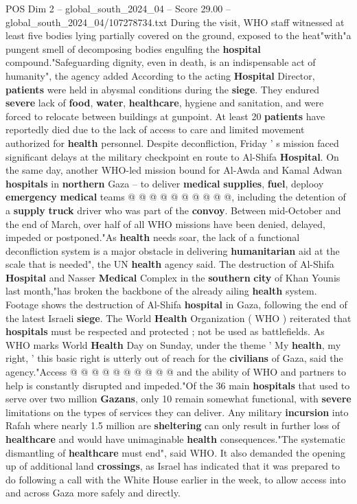 \begin{textsample}{POS Dim 2 – global\_south\_2024\_04 – Score 29.00 – global\_south\_2024\_04/107278734.txt}
During the visit, WHO staff witnessed at least five bodies lying partially covered on the ground, exposed to the heat"with"a pungent smell of decomposing bodies engulfing the \textbf{hospital} compound."Safeguarding dignity, even in death, is an indispensable act of humanity", the agency added According to the acting \textbf{Hospital} Director, \textbf{patients} were held in abysmal conditions during the \textbf{siege}.
They endured \textbf{severe} lack of \textbf{food}, \textbf{water}, \textbf{healthcare}, hygiene and sanitation, and were forced to relocate between buildings at gunpoint.
At least 20 \textbf{patients} have reportedly died due to the lack of access to care and limited movement authorized for \textbf{health} personnel.
Despite deconfliction, Friday ' s mission faced significant delays at the military checkpoint en route to Al-Shifa \textbf{Hospital}.
On the same day, another WHO-led mission bound for Al-Awda and Kamal Adwan \textbf{hospitals} in \textbf{northern} Gaza -- to deliver \textbf{medical} \textbf{supplies}, \textbf{fuel}, deplooy \textbf{emergency} \textbf{medical} teams @ @ @ @ @ @ @ @ @ @, including the detention of a \textbf{supply} \textbf{truck} driver who was part of the \textbf{convoy}.
Between mid-October and the end of March, over half of all WHO missions have been denied, delayed, impeded or postponed."As \textbf{health} needs soar, the lack of a functional deconfliction system is a major obstacle in delivering \textbf{humanitarian} aid at the scale that is needed", the UN \textbf{health} agency said.
The destruction of Al-Shifa \textbf{Hospital} and Nasser \textbf{Medical} Complex in the \textbf{southern} \textbf{city} of Khan Younis last month,"has broken the backbone of the already ailing \textbf{health} system.
Footage shows the destruction of Al-Shifa \textbf{hospital} in Gaza, following the end of the latest Israeli \textbf{siege}.
The World \textbf{Health} Organization ( WHO ) reiterated that \textbf{hospitals} must be respected and protected ; not be used as battlefields.
As WHO marks World \textbf{Health} Day on Sunday, under the theme ' My \textbf{health}, my right, ' this basic right is utterly out of reach for the \textbf{civilians} of Gaza, said the agency."Access @ @ @ @ @ @ @ @ @ @ and the ability of WHO and partners to help is constantly disrupted and impeded."Of the 36 main \textbf{hospitals} that used to serve over two million \textbf{Gazans}, only 10 remain somewhat functional, with \textbf{severe} limitations on the types of services they can deliver.
Any military \textbf{incursion} into Rafah where nearly 1.5 million are \textbf{sheltering} can only result in further loss of \textbf{healthcare} and would have unimaginable \textbf{health} consequences."The systematic dismantling of \textbf{healthcare} must end", said WHO.
It also demanded the opening up of additional land \textbf{crossings}, as Israel has indicated that it was prepared to do following a call with the White House earlier in the week, to allow access into and across Gaza more safely and directly.


\end{textsample}
